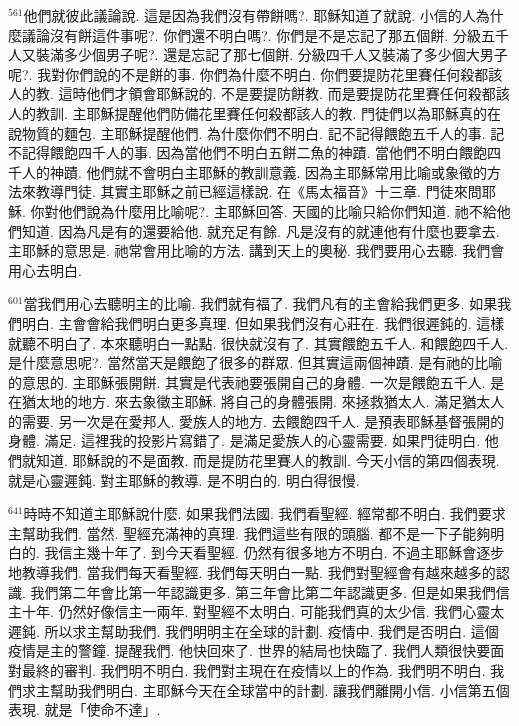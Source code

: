 \documentclass{book}
\begin{document}
$^{561}$他們就彼此議論說.
這是因為我們沒有帶餅嗎?.
耶穌知道了就說.
小信的人為什麼議論沒有餅這件事呢?.
你們還不明白嗎?.
你們是不是忘記了那五個餅.
分級五千人又裝滿多少個男子呢?.
還是忘記了那七個餅.
分級四千人又裝滿了多少個大男子呢?.
我對你們說的不是餅的事.
你們為什麼不明白.
你們要提防花里賽任何殺都該人的教.
這時他們才領會耶穌說的.
不是要提防餅教.
而是要提防花里賽任何殺都該人的教訓.
主耶穌提醒他們防備花里賽任何殺都該人的教.
門徒們以為耶穌真的在說物質的麵包.
主耶穌提醒他們.
為什麼你們不明白.
記不記得餵飽五千人的事.
記不記得餵飽四千人的事.
因為當他們不明白五餅二魚的神蹟.
當他們不明白餵飽四千人的神蹟.
他們就不會明白主耶穌的教訓意義.
因為主耶穌常用比喻或象徵的方法來教導門徒.
其實主耶穌之前已經這樣說.
在《馬太福音》十三章.
門徒來問耶穌.
你對他們說為什麼用比喻呢?.
主耶穌回答.
天國的比喻只給你們知道.
祂不給他們知道.
因為凡是有的還要給他.
就充足有餘.
凡是沒有的就連他有什麼也要拿去.
主耶穌的意思是.
祂常會用比喻的方法.
講到天上的奧秘.
我們要用心去聽.
我們會用心去明白.

$^{601}$當我們用心去聽明主的比喻.
我們就有福了.
我們凡有的主會給我們更多.
如果我們明白.
主會會給我們明白更多真理.
但如果我們沒有心莊在.
我們很遲鈍的.
這樣就聽不明白了.
本來聽明白一點點.
很快就沒有了.
其實餵飽五千人.
和餵飽四千人.
是什麼意思呢?.
當然當天是餵飽了很多的群眾.
但其實這兩個神蹟.
是有祂的比喻的意思的.
主耶穌張開餅.
其實是代表祂要張開自己的身體.
一次是餵飽五千人.
是在猶太地的地方.
來去象徵主耶穌.
將自己的身體張開.
來拯救猶太人.
滿足猶太人的需要.
另一次是在愛邦人.
愛族人的地方.
去餵飽四千人.
是預表耶穌基督張開的身體.
滿足.
這裡我的投影片寫錯了.
是滿足愛族人的心靈需要.
如果門徒明白.
他們就知道.
耶穌說的不是面教.
而是提防花里賽人的教訓.
今天小信的第四個表現.
就是心靈遲鈍.
對主耶穌的教導.
是不明白的.
明白得很慢.

$^{641}$時時不知道主耶穌說什麼.
如果我們法國.
我們看聖經.
經常都不明白.
我們要求主幫助我們.
當然.
聖經充滿神的真理.
我們這些有限的頭腦.
都不是一下子能夠明白的.
我信主幾十年了.
到今天看聖經.
仍然有很多地方不明白.
不過主耶穌會逐步地教導我們.
當我們每天看聖經.
我們每天明白一點.
我們對聖經會有越來越多的認識.
我們第二年會比第一年認識更多.
第三年會比第二年認識更多.
但是如果我們信主十年.
仍然好像信主一兩年.
對聖經不太明白.
可能我們真的太少信.
我們心靈太遲鈍.
所以求主幫助我們.
我們明明主在全球的計劃.
疫情中.
我們是否明白.
這個疫情是主的警鐘.
提醒我們.
他快回來了.
世界的結局也快臨了.
我們人類很快要面對最終的審判.
我們明不明白.
我們對主現在在疫情以上的作為.
我們明不明白.
我們求主幫助我們明白.
主耶穌今天在全球當中的計劃.
讓我們離開小信.
小信第五個表現.
就是「使命不達」.
\end{document}
